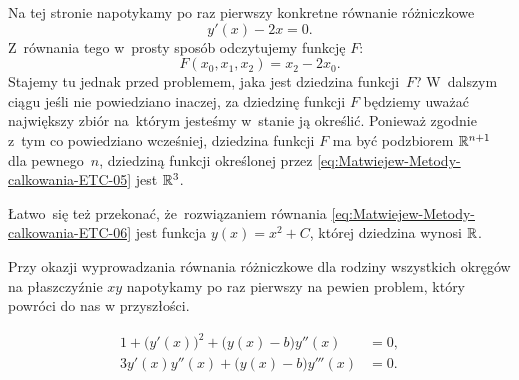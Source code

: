 \documentclass[a4paper,11pt]{article}
\begin{document}
\noindent
{} Na tej stronie napotykamy po raz pierwszy konkretne równanie
różniczkowe
\begin{equation}
  \label{eq:Matwiejew-Metody-calkowania-ETC-06}
  y'( x ) - 2 x = 0.
\end{equation}
Z~równania tego w~prosty sposób odczytujemy funkcję $F$:
\begin{equation}
  \label{eq:Matwiejew-Metody-calkowania-ETC-07}
  F( x_{ 0 }, x_{ 1 }, x_{ 2 } ) = x_{ 2 } - 2 x_{ 0 }.
\end{equation}
Stajemy tu jednak przed problemem, jaka jest dziedzina funkcji~$F$?
W~dalszym ciągu jeśli nie powiedziano inaczej, za dziedzinę funkcji $F$
będziemy uważać największy zbiór na~którym jesteśmy w~stanie ją określić.
Ponieważ zgodnie z~tym co powiedziano wcześniej, dziedzina funkcji $F$ ma
być podzbiorem $\mathbb{R}^{ n + 1 }$ dla pewnego~$n$, dziedziną funkcji określonej
przez \eqref{eq:Matwiejew-Metody-calkowania-ETC-05} jest $\mathbb{R}^{ 3 }$.

Łatwo~się też przekonać, że~rozwiązaniem równania
\eqref{eq:Matwiejew-Metody-calkowania-ETC-06} jest funkcja
$y( x ) = x^{ 2 } + C$, której dziedzina wynosi $\mathbb{R}$.

\vspace{\VerSpaceFour}





\noindent
{} Przy okazji wyprowadzania równania różniczkowe dla rodziny
wszystkich okręgów na płaszczyźnie $x y$ napotykamy po raz pierwszy na
pewien problem, który powróci do nas w przyszłości.

\vspace{\negVerSpaceThree}


\begin{subequations}

  \begin{align}
    \label{eq:Matwiejew-Metody-calkowania-ETC-08-A}
    1 + \big( y'( x ) \big)^{ 2 } + \big( y( x ) - b \big) y''( x )
    &= 0, \\
    \label{eq:Matwiejew-Metody-calkowania-ETC-08-B}
    3 y'( x ) y''( x ) + \big( y( x ) - b \big) y'''( x )
    &= 0.
  \end{align}

\end{subequations}
\end{document}
